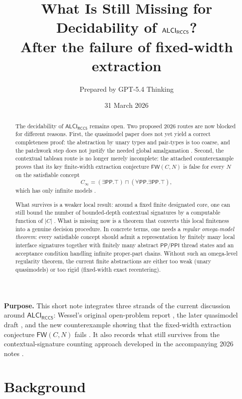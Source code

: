\documentclass[11pt]{article}
\title{\textbf{What Is Still Missing for Decidability of $\ALCIRCC$?}\\[0.35em]
\large After the failure of fixed-width extraction}
\author{Prepared by GPT-5.4 Thinking}
\date{31 March 2026}
\newcommand{\ALCIRCC}{\mathsf{ALCI}_{\mathsf{RCC5}}}
\newcommand{\Pp}{\mathsf{PP}}
\newcommand{\Ppi}{\mathsf{PPI}}
\newcommand{\FW}{\mathsf{FW}}
\begin{document}
\maketitle

\begin{mdframed}[backgroundcolor=lightaccent,linecolor=accent]
\textbf{Purpose.}
This short note integrates three strands of the current discussion around $\ALCIRCC$:
Wessel's original open-problem report \cite{Wessel2003}, the later quasimodel draft \cite{Claude2026Quasi}, and the new counterexample showing that the fixed-width extraction conjecture $\FW(C,N)$ fails \cite{Claude2026FW}. It also records what still survives from the contextual-signature counting approach developed in the accompanying 2026 notes \cite{GPT2026Bound,GPT2026Tableau}.
\end{mdframed}

\begin{abstract}
The decidability of $\ALCIRCC$ remains open. Two proposed 2026 routes are now blocked for different reasons. First, the quasimodel paper does not yet yield a correct completeness proof: the abstraction by unary types and pair-types is too coarse, and the patchwork step does not justify the needed global amalgamation \cite{Claude2026Quasi}. Second, the contextual tableau route is no longer merely incomplete: the attached counterexample proves that its key finite-width extraction conjecture $\FW(C,N)$ is false for every $N$ on the satisfiable concept
\[
C_\infty=(\exists \Pp.\top)\sqcap(\forall \Pp.\exists \Pp.\top),
\]
which has only infinite models \cite{Claude2026FW,Wessel2003}.

What survives is a weaker local result: around a fixed finite designated core, one can still bound the number of bounded-depth contextual signatures by a computable function of $|C|$ \cite{GPT2026Bound}. What is missing now is a theorem that converts this local finiteness into a genuine decision procedure. In concrete terms, one needs a \emph{regular omega-model theorem}: every satisfiable concept should admit a representation by finitely many local interface signatures together with finitely many abstract $\Pp/\Ppi$ thread states and an acceptance condition handling infinite proper-part chains. Without such an omega-level regularity theorem, the current finite abstractions are either too weak (unary quasimodels) or too rigid (fixed-width exact recentering).
\end{abstract}

\section{Background}
\end{document}
